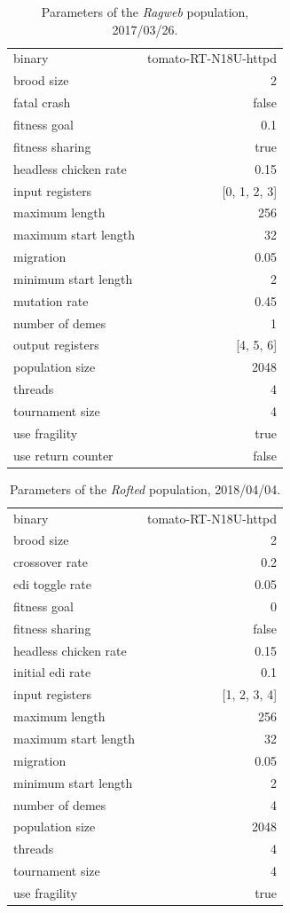 \documentclass[12pt,glossary]{dalthesis}
\begin{document}
\begin{table}[htbp]
\caption{Parameters of the \emph{Ragweb} population, 2017/03/26.}
\centering
\begin{tabular}{lr}
binary & tomato-RT-N18U-httpd\\
brood size & 2\\
fatal crash & false\\
fitness goal & 0.1\\
fitness sharing & true\\
headless chicken rate & 0.15\\
input registers & [0, 1, 2, 3]\\
maximum length & 256\\
maximum start length & 32\\
migration & 0.05\\
minimum start length & 2\\
mutation rate & 0.45\\
number of demes & 1\\
output registers & [4, 5, 6]\\
population size & 2048\\
threads & 4\\
tournament size & 4\\
use fragility & true\\
use return counter & false\\
\end{tabular}
\end{table}



\begin{table}[htbp]
\caption{Parameters of the \emph{Rofted} population, 2018/04/04.}
\centering
\begin{tabular}{lr}
binary & tomato-RT-N18U-httpd\\
brood size & 2\\
crossover rate & 0.2\\
edi toggle rate & 0.05\\
fitness goal & 0\\
fitness sharing & false\\
headless chicken rate & 0.15\\
initial edi rate & 0.1\\
input registers & [1, 2, 3, 4]\\
maximum length & 256\\
maximum start length & 32\\
migration & 0.05\\
minimum start length & 2\\
number of demes & 4\\
population size & 2048\\
threads & 4\\
tournament size & 4\\
use fragility & true\\
\end{tabular}
\end{table}
\end{document}
